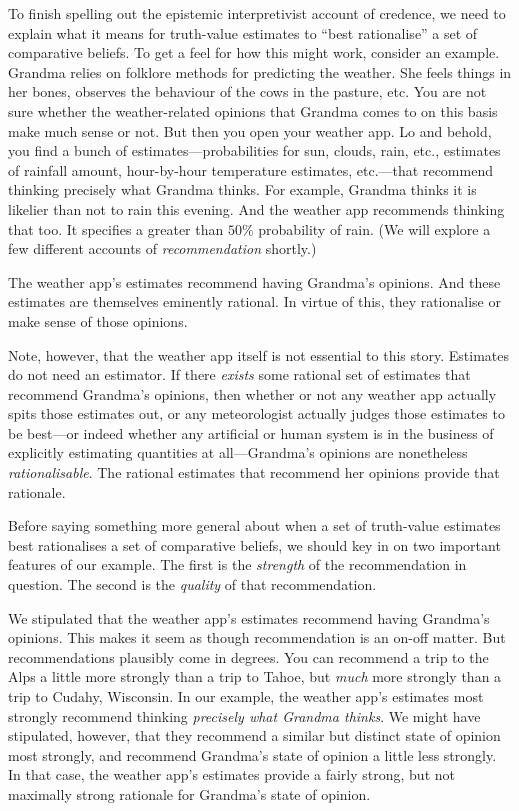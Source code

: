 To finish spelling out the epistemic interpretivist account of credence, we need to explain what it means for truth-value estimates to ``best rationalise'' a set of comparative beliefs. To get a feel for how this might work, consider an example. Grandma relies on folklore methods for predicting the weather. She feels things in her bones, observes the behaviour of the cows in the pasture, etc. You are not sure whether the weather-related opinions that Grandma comes to on this basis make much sense or not. But then you open your weather app. Lo and behold, you find a bunch of estimates---probabilities for sun, clouds, rain, etc., estimates of rainfall amount, hour-by-hour temperature estimates, etc.---that recommend thinking precisely what Grandma thinks. For example, Grandma thinks it is likelier than not to rain this evening. And the weather app recommends thinking that too. It specifies a greater than $50\%$ probability of rain. (We will explore a few different accounts of \textit{recommendation} shortly.)

The weather app's estimates recommend having Grandma's opinions. And these estimates are themselves eminently rational. In virtue of this, they rationalise or make sense of those opinions.

Note, however, that the weather app itself is not essential to this story. Estimates do not need an estimator. If there \textit{exists} some rational set of estimates that recommend Grandma's opinions, then whether or not any weather app actually spits those estimates out, or any meteorologist actually judges those estimates to be best---or indeed whether any artificial or human system is in the business of explicitly estimating quantities at all---Grandma's opinions are nonetheless \textit{rationalisable}. The rational estimates that recommend her opinions provide that rationale.

Before saying something more general about when a set of truth-value estimates best rationalises a set of comparative beliefs, we should key in on two important features of our example. The first is the \textit{strength} of the recommendation in question. The second is the \textit{quality} of that recommendation.

We stipulated that the weather app's estimates recommend having Grandma's opinions. This makes it seem as though recommendation is an on-off matter. But recommendations plausibly come in degrees. You can recommend a trip to the Alps a little more strongly than a trip to Tahoe, but \textit{much} more strongly than a trip to Cudahy, Wisconsin. In our example, the weather app's estimates most strongly recommend thinking \textit{precisely what Grandma thinks}. We might have stipulated, however, that they recommend a similar but distinct state of opinion most strongly, and recommend Grandma's state of opinion a little less strongly. In that case, the weather app's estimates provide a fairly strong, but not maximally strong rationale for Grandma's state of opinion.

